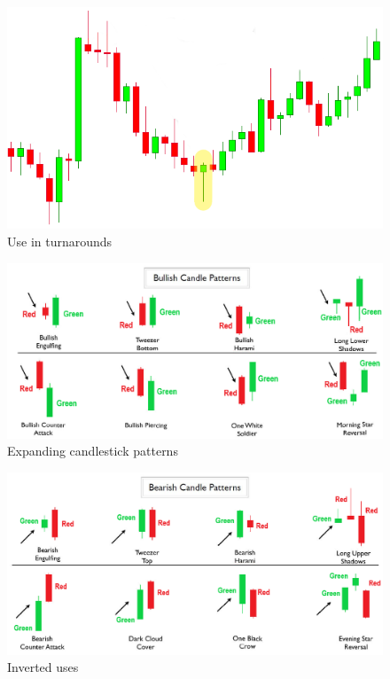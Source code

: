 \documentclass{article}
\begin{document}
\vspace{10pt}

\begin{figure}[!htb]
    \centering
    \includegraphics[width=\textwidth]{imgs/69.png}
    \caption{Use in turnarounds}
\end{figure}

\vspace{10pt}

\begin{figure}[!htb]
    \centering
    \includegraphics[width=\textwidth]{imgs/70.png}
    \caption{Expanding candlestick patterns}
\end{figure}

\vspace{10pt}

\begin{figure}[!htb]
    \centering
    \includegraphics[width=\textwidth]{imgs/71.png}
    \caption{Inverted uses}
\end{figure}
\end{document}
